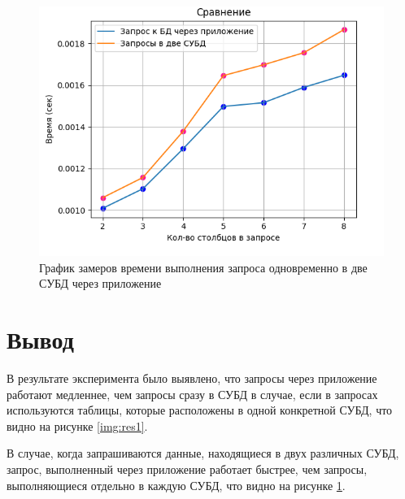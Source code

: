 \begin{figure}[h!]
	\begin{center}
		\includegraphics[scale=0.7]{./inc/img/res2}
		\caption{График замеров времени выполнения запроса одновременно в две СУБД через приложение}
		\label{img:res2}
	\end{center}
\end{figure}

\newpage

\section{Вывод}

В результате эксперимента было выявлено, что запросы через приложение работают медленнее, чем запросы сразу в СУБД в случае, если в запросах используются таблицы, которые расположены в одной конкретной СУБД, что видно на рисунке \ref{img:res1}. 

В случае, когда запрашиваются данные, находящиеся в двух различных СУБД, запрос, выполненный через приложение работает быстрее, чем запросы, выполняющиеся отдельно в каждую СУБД, что видно на рисунке \ref{img:res2}.
